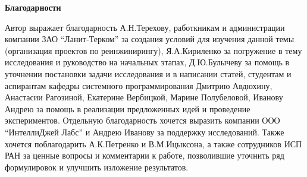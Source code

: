 \textbf{Благодарности}

Автор выражает благодарность А.Н.Терехову, работкникам и администрации компании ЗАО ``Ланит-Терком'' за создания условий для изучения данной темы (организация проектов по реинжинирингу), Я.А.Кириленко за погружение в тему исследования и руководство на начальных этапах, Д.Ю.Булычеву за помощь в уточнении постановки задачи исследования и в написании статей, студентам и аспирантам кафедры системного программирования Дмитрию Авдюхину, Анастасии Рагозиной, Екатерине Вербицкой, Марине Полубеловой, Иванову Андрею за помощь в реализации предложенных идей и проведение экспериментов. Отдельную благодарность  хочется выразить компании ООО ``ИнтеллиДжей Лабс'' и Андрею Иванову за поддержку исследований. Также хочется поблагодарить А.К.Петренко и В.М.Ицыксона, а также сотрудников ИСП РАН за ценные вопросы и комментарии к работе, позволившие уточнить ряд формулировок и улучшить изложение результатов. 
